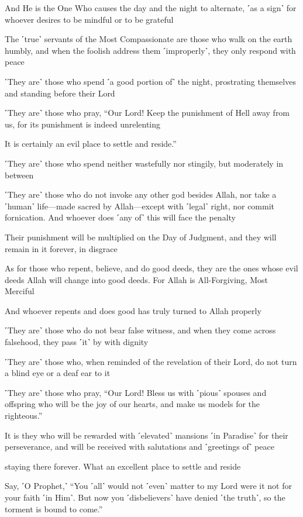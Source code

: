 And He is the One Who causes the day and the night to alternate, ˹as a sign˺ for whoever desires to be mindful or to be grateful

The ˹true˺ servants of the Most Compassionate are those who walk on the earth humbly, and when the foolish address them ˹improperly˺, they only respond with peace

˹They are˺ those who spend ˹a good portion of˺ the night, prostrating themselves and standing before their Lord

˹They are˺ those who pray, “Our Lord! Keep the punishment of Hell away from us, for its punishment is indeed unrelenting

It is certainly an evil place to settle and reside.”

˹They are˺ those who spend neither wastefully nor stingily, but moderately in between

˹They are˺ those who do not invoke any other god besides Allah, nor take a ˹human˺ life—made sacred by Allah—except with ˹legal˺ right, nor commit fornication. And whoever does ˹any of˺ this will face the penalty

Their punishment will be multiplied on the Day of Judgment, and they will remain in it forever, in disgrace

As for those who repent, believe, and do good deeds, they are the ones whose evil deeds Allah will change into good deeds. For Allah is All-Forgiving, Most Merciful

And whoever repents and does good has truly turned to Allah properly

˹They are˺ those who do not bear false witness, and when they come across falsehood, they pass ˹it˺ by with dignity

˹They are˺ those who, when reminded of the revelation of their Lord, do not turn a blind eye or a deaf ear to it

˹They are˺ those who pray, “Our Lord! Bless us with ˹pious˺ spouses and offspring who will be the joy of our hearts, and make us models for the righteous.”

It is they who will be rewarded with ˹elevated˺ mansions ˹in Paradise˺ for their perseverance, and will be received with salutations and ˹greetings of˺ peace

staying there forever. What an excellent place to settle and reside

Say, ˹O Prophet,˺ “You ˹all˺ would not ˹even˺ matter to my Lord were it not for your faith ˹in Him˺. But now you ˹disbelievers˺ have denied ˹the truth˺, so the torment is bound to come.”

